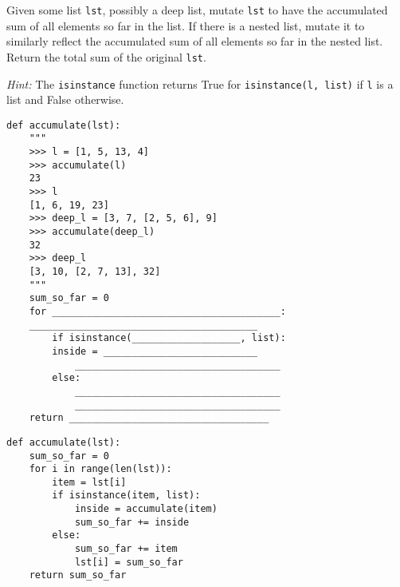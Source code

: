 \begin{blocksection}
\question Given some list \texttt{lst}, possibly a deep list, mutate \texttt{lst} to have the accumulated sum of all elements so far in the list. If there is a nested list, mutate it to similarly reflect the accumulated sum of all elements so far in the nested list. Return the total sum of the original \texttt{lst}.

\emph{Hint:} The \lstinline$isinstance$ function returns True for \lstinline$isinstance(l, list)$ if \texttt{l} is a list and False otherwise.

\begin{lstlisting}
def accumulate(lst):
    """
    >>> l = [1, 5, 13, 4]
    >>> accumulate(l)
    23
    >>> l
    [1, 6, 19, 23]
    >>> deep_l = [3, 7, [2, 5, 6], 9]
    >>> accumulate(deep_l)
    32
    >>> deep_l
    [3, 10, [2, 7, 13], 32]
    """
    sum_so_far = 0
    for ________________________________________:
	________________________________________
        if isinstance(___________________, list):
	    inside = ___________________________
            ____________________________________
        else:
            ____________________________________
            ____________________________________
    return ___________________________________
\end{lstlisting}
\end{blocksection}

\begin{blocksection}
\begin{solution}[1in]
\begin{lstlisting}
def accumulate(lst):
    sum_so_far = 0
    for i in range(len(lst)):
        item = lst[i]
        if isinstance(item, list):
            inside = accumulate(item)
            sum_so_far += inside
        else:
            sum_so_far += item
            lst[i] = sum_so_far
    return sum_so_far
\end{lstlisting}
\end{solution}
\end{blocksection}



